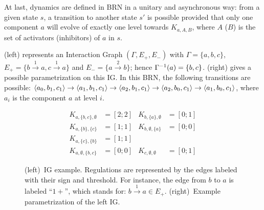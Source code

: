 At last, dynamics are defined in BRN in a unitary and asynchronous way:
from a given state $s$, a transition to another state $s'$ is possible provided that only one component $a$ will evolve of exactly one level towards $K_{a,A,B}$, where $A$ (\resp $B$) is the set of activators (\resp inhibitors) of $a$ in $s$.

\begin{example*}
(left) represents an Interaction Graph $(\Gamma,E_+,E_-)$ with
$\Gamma = \{a, b, c\}$,
$E_+ = \{b \xrightarrow{1} a, c \xrightarrow{1} a\}$ and
$E_- = \{a \xrightarrow{2} b\}$;
hence $\Gamma^{-1}(a) = \{b, c\}$.
(right) gives a possible parametrization on this IG.
In this BRN, the following transitions are possible:
$\mbox{$\langle a_0, b_1, c_1 \rangle$} \rightarrow \mbox{$\langle a_1, b_1, c_1 \rangle$} \rightarrow \mbox{$\langle a_2, b_1, c_1 \rangle$} \rightarrow
\mbox{$\langle a_2, b_0, c_1 \rangle$} \rightarrow \mbox{$\langle a_1, b_0, c_1 \rangle$}$,
where $a_i$ is the component $a$ at level $i$.
\end{example*}

\begin{figure}[t]
\begin{minipage}{0.4\linewidth}
\centering
{}
\end{minipage}
\begin{minipage}{0.6\linewidth}
\centering
\begin{align*}
K_{a,\{b,c\},\emptyset} &= [2 ; 2] & K_{b,\{a\},\emptyset} &= [0 ; 1] \\
K_{a,\{b\},\{c\}} &= [1 ; 1] & K_{b,\emptyset,\{a\}} &= [0 ; 0] \\
K_{a,\{c\},\{b\}} &= [1 ; 1] &&\\
K_{a,\emptyset,\{b,c\}} &= [0 ; 0] & K_{c,\emptyset,\emptyset} &= [0 ; 1]
\end{align*}
\end{minipage}
\caption{\label{fig:runningBRN}
(left)~IG example.
Regulations are represented by the edges labeled with their sign and threshold.
For instance, the edge from $b$ to $a$ is labeled “$1+$”, which stands for: $b \xrightarrow{1} a \in
E_+$.
(right)~Example parametrization of the left IG.
}
\end{figure}
